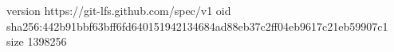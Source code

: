 version https://git-lfs.github.com/spec/v1
oid sha256:442b91bbf63bff6fd640151942134684ad88eb37c2ff04eb9617c21eb59907c1
size 1398256
